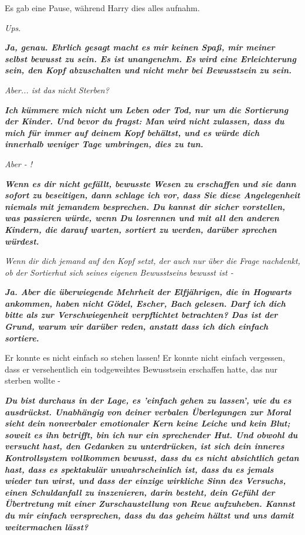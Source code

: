 Es gab eine Pause, während Harry dies alles aufnahm.

\emph{Ups}.

\textbf{\emph{\glqq Ja, genau. Ehrlich gesagt macht es mir keinen Spaß, mir
meiner selbst bewusst zu sein. Es ist unangenehm. Es wird eine Erleichterung
sein, den Kopf abzuschalten und nicht mehr bei Bewusstsein zu sein.\grqq{}}}

\emph{Aber... ist das nicht Sterben?}

\textbf{\emph{\glqq Ich kümmere mich nicht um Leben oder Tod, nur um die
Sortierung der Kinder. Und bevor du fragst: Man wird nicht zulassen, dass du
mich für immer auf deinem Kopf behältst, und es würde dich innerhalb weniger
Tage umbringen, dies zu tun.\grqq{}}}

\emph{Aber - !}

\textbf{\emph{\glqq Wenn es dir nicht gefällt, bewusste Wesen zu erschaffen und
sie dann sofort zu beseitigen, dann schlage ich vor, dass Sie diese
Angelegenheit niemals mit jemandem besprechen. Du kannst dir sicher vorstellen,
was passieren würde, wenn Du losrennen und mit all den anderen Kindern, die
darauf warten, sortiert zu werden, darüber sprechen würdest.\grqq{}}}

\emph{Wenn dir dich jemand auf den Kopf setzt, der auch nur über die Frage
nachdenkt, ob der Sortierhut sich seines eigenen Bewusstseins bewusst ist -}

\textbf{\emph{\glqq Ja. Aber die überwiegende Mehrheit der Elfjährigen, die in
Hogwarts ankommen, haben nicht Gödel, Escher, Bach gelesen. Darf ich dich bitte
als zur Verschwiegenheit verpflichtet betrachten? Das ist der Grund, warum wir
darüber reden, anstatt dass ich dich einfach sortiere.\grqq{}}}

Er konnte es nicht einfach so stehen lassen! Er konnte nicht einfach vergessen,
dass er versehentlich ein todgeweihtes Bewusstsein erschaffen hatte, das nur
sterben wollte -

\textbf{\emph{\glqq Du bist durchaus in der Lage, es 'einfach gehen zu lassen',
wie du es ausdrückst. Unabhängig von deiner verbalen Überlegungen zur Moral
sieht dein nonverbaler emotionaler Kern keine Leiche und kein Blut; soweit es
ihn betrifft, bin ich nur ein sprechender Hut. Und obwohl du versucht hast, den
Gedanken zu unterdrücken, ist sich dein inneres Kontrollsystem vollkommen
bewusst, dass du es nicht absichtlich getan hast, dass es spektakulär
unwahrscheinlich ist, dass du es jemals wieder tun wirst, und dass der einzige
wirkliche Sinn des Versuchs, einen Schuldanfall zu inszenieren, darin besteht,
dein Gefühl der Übertretung mit einer Zurschaustellung von Reue aufzuheben.
Kannst du mir einfach versprechen, dass du das geheim hältst und uns damit
weitermachen lässt?\grqq{}}}

